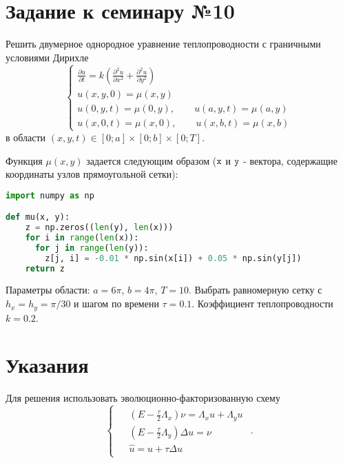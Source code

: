 \documentclass{report}
\begin{document}
\section*{Задание к семинару №10}
Решить двумерное однородное уравнение теплопроводности с граничными условиями Дирихле 
\begin{equation} \label{c10eq1}
	\begin{cases}
		\displaystyle \frac{\partial u}{\partial t} = k \left( \frac{\partial^2 u}{\partial x^2} + \frac{\partial^2 u}{\partial y^2} \right) \\
		\displaystyle u(x,y,0) = \mu(x,y) \\
		u(0,y,t) = \mu(0,y), \qquad u(a,y,t) = \mu(a,y)\\  
		u(x,0,t) = \mu(x,0), \qquad u(x,b,t) = \mu(x,b)
	\end{cases}
\end{equation}
в области $(x,y,t) \in [0; a] \times [0; b] \times [0; T]$.

Функция $\mu(x,y)$ задается следующим образом ($\texttt{\lstinline|x|}$ и $\texttt{\lstinline|y|}$ - вектора, содержащие координаты узлов прямоугольной сетки):
\begin{lstlisting}[language=Python, basicstyle=\small]
import numpy as np

def mu(x, y):
	z = np.zeros((len(y), len(x)))
	for i in range(len(x)):
	  for j in range(len(y)):
	    z[j, i] = -0.01 * np.sin(x[i]) + 0.05 * np.sin(y[j])
	return z
	\end{lstlisting}
Параметры области: $a = 6\pi$, $b = 4\pi$, $T = 10$. Выбрать равномерную сетку с $h_x = h_y = \pi/30$ и шагом по времени $\tau = 0.1$. Коэффициент теплопроводности $k = 0.2$.

\section*{Указания}
Для решения использовать эволюционно-факторизованную схему
\begin{equation} \label{c10eq2}
    \begin{cases}
        \begin{aligned}
            &\left(E - \frac{\tau}{2} \Lambda_x \right) \nu = \Lambda_x u + \Lambda_y u \\
            &\left(E - \frac{\tau}{2} \Lambda_y \right) \Delta u = \nu \\
            &\hat{u} = u + \tau \Delta u
        \end{aligned}
    \end{cases}.
\end{equation}
\end{document}
